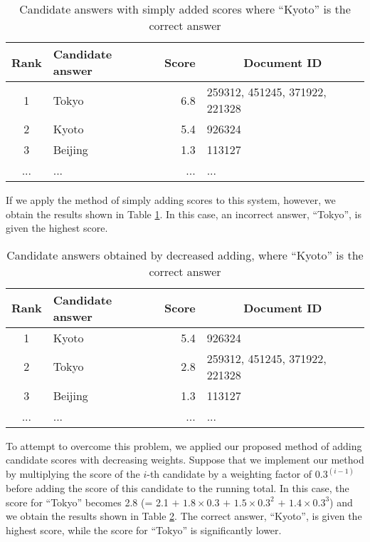 \begin{table}[t]
  \begin{center}
    \caption{Candidate answers with simply added scores where ``Kyoto'' is the correct answer}
    \begin{tabular}{|c|l|r|l|} \hline
Rank & Candidate answer & Score & \multicolumn{1}{c|}{Document ID}\\\hline
1 & Tokyo & 6.8 & 259312, 451245, 371922, 221328\\
2 & Kyoto & 5.4 & 926324\\
3 & Beijing & 1.3 &113127\\
... & ... & ...& ...\\\hline
\end{tabular}
\label{tab:plural_candidates4}
\end{center}
\end{table}

If we apply the method of simply adding scores 
to this system, however, 
we obtain the results shown in Table \ref{tab:plural_candidates4}. 
In this case, an incorrect answer, ``Tokyo'', is given the highest score. 

\begin{table}[t]
  \begin{center}
    \caption{Candidate answers obtained by decreased adding, where ``Kyoto'' is the correct answer}
    \begin{tabular}{|c|l|r|l|} \hline
Rank & Candidate answer & Score & \multicolumn{1}{c|}{Document ID}\\\hline
1 & Kyoto & 5.4 & 926324\\
2 & Tokyo & 2.8 & 259312, 451245, 371922, 221328\\
3 & Beijing & 1.3 &113127\\
... & ... & ...& ...\\\hline
\end{tabular}
\label{tab:plural_candidates5}
\end{center}
\end{table}

To attempt to overcome this problem, 
we applied our proposed method 
of adding candidate scores with decreasing weights. 
Suppose that 
we implement our method by multiplying the score of the $i$-th candidate by a weighting factor of $0.3^{(i-1)}$
before adding the score of this candidate to the running total. 
In this case, the score for ``Tokyo'' becomes 2.8 (= 2.1 $+$ $1.8 \times 0.3$ $+$ $1.5 \times 0.3^2$ $+$ $1.4 \times 0.3^3$) 
and we obtain the results shown in Table \ref{tab:plural_candidates5}. 
The correct answer, 
``Kyoto'', is given the highest score, 
while the score for ``Tokyo'' is significantly lower. 

